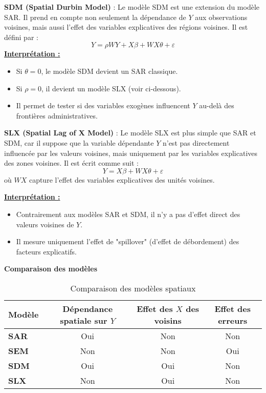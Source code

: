 \documentclass[
]{article}
\begin{document}
\textbf{SDM (Spatial Durbin Model)} : Le modèle SDM est une extension du
modèle SAR. Il prend en compte non seulement la dépendance de \(Y\) aux
observations voisines, mais aussi l'effet des variables explicatives des
régions voisines. Il est défini par : \[
Y = \rho W Y + X \beta + W X \theta + \varepsilon
\] \underline{\textbf{Interprétation :}}

\begin{itemize}
\item Si \( \theta = 0 \), le modèle SDM devient un SAR classique.
\item Si \( \rho = 0 \), il devient un modèle SLX (voir ci-dessous).
\item Il permet de tester si des variables exogènes influencent \( Y \) au-delà des frontières administratives.
\end{itemize}

\textbf{SLX (Spatial Lag of X Model)} : Le modèle SLX est plus simple
que SAR et SDM, car il suppose que la variable dépendante \(Y\) n'est
pas directement influencée par les valeurs voisines, mais uniquement par
les variables explicatives des zones voisines. Il est écrit comme suit :
\[
Y = X \beta + W X \theta + \varepsilon
\] où \(W X\) capture l'effet des variables explicatives des unités
voisines.

\underline{\textbf{Interprétation :}}

\begin{itemize}
\item Contrairement aux modèles SAR et SDM, il n’y a pas d’effet direct des valeurs voisines de \( Y \).
\item Il mesure uniquement l'effet de "spillover" (d'effet de débordement) des facteurs explicatifs.
\end{itemize}

\textbf{Comparaison des modèles}

\begin{table}[h]
    \centering
    \begin{tabular}{|l|c|c|c|}
        \hline
        \textbf{Modèle} & \textbf{Dépendance spatiale sur \( Y \)} & \textbf{Effet des \( X \) des voisins} & \textbf{Effet des erreurs} \\
        \hline
        \textbf{SAR}  & Oui  & Non  & Non \\
        \hline
        \textbf{SEM}  & Non  & Non  & Oui \\
        \hline
        \textbf{SDM}  & Oui  & Oui  & Non \\
        \hline
        \textbf{SLX}  & Non  & Oui  & Non \\
        \hline
    \end{tabular}
    \caption{Comparaison des modèles spatiaux}
    \label{tab:comparaison_modeles}
\end{table}
\end{document}
